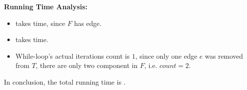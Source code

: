 \begin{homeworkProblem}
\begin{homeworkSubProblem}
\vspace{0.1in}\noindent\textbf{Running Time Analysis:}

\begin{itemize}
    \item {} takes  time,
        since $F$ has  edge.
    \item {} takes
         time.
    \item While-loop's actual iterations count is $1$,
        since only one edge $e$ was removed from $T$,
        there are only two component in $F$,
        i.e. $count = 2$.
\end{itemize}

In conclusion, the total running time is .

\end{homeworkSubProblem}

\end{homeworkProblem}


